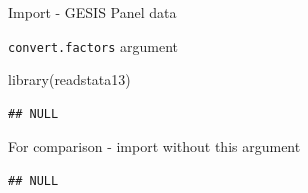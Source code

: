 \documentclass[
  10pt,
  ignorenonframetext,
]{beamer}
\newenvironment{Shaded}{\begin{snugshade}}{\end{snugshade}}
\newcommand{\DataTypeTok}[1]{\textcolor[rgb]{0.87,0.87,0.75}{#1}}
\newcommand{\KeywordTok}[1]{\textcolor[rgb]{0.94,0.87,0.69}{#1}}
\newcommand{\NormalTok}[1]{\textcolor[rgb]{0.80,0.80,0.80}{#1}}
\newcommand{\OperatorTok}[1]{\textcolor[rgb]{0.94,0.94,0.82}{#1}}
\newcommand{\StringTok}[1]{\textcolor[rgb]{0.80,0.58,0.58}{#1}}
\begin{document}
\begin{frame}[fragile]{Import - GESIS Panel data}
\protect\hypertarget{import---gesis-panel-data}{}

\begin{block}{\texttt{convert.factors} argument}

\begin{Shaded}
\begin{Highlighting}[]
\KeywordTok{library}\NormalTok{(readstata13)}
\end{Highlighting}
\end{Shaded}

\begin{Shaded}
\end{Shaded}

\begin{verbatim}
## NULL
\end{verbatim}

\end{block}

\begin{block}{For comparison - import without this argument}

\begin{Shaded}
\end{Shaded}

\begin{verbatim}
## NULL
\end{verbatim}

\end{block}

\end{frame}
\end{document}
